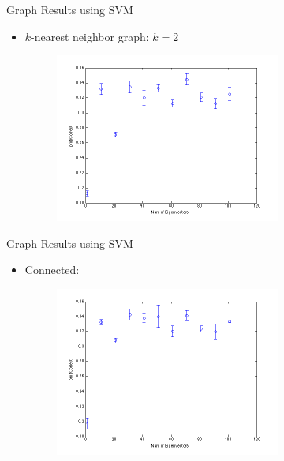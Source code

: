 \documentclass[xcolor=dvipsnames,t]{beamer} %
\begin{document}
\begin{frame}{Graph Results using SVM}
\begin{itemize}
\item $k$-nearest neighbor graph: $k=2$ 
\begin{figure}[h!]
  \centering
    \includegraphics[width=0.7\textwidth]{figures/plotopt2k2n2.png}
\end{figure}
\end{itemize}
\end{frame}
\begin{frame}{Graph Results using SVM}
\begin{itemize}
\item Connected:  
\begin{figure}[h!]
  \centering
    \includegraphics[width=0.7\textwidth]{figures/plotopt3n2.png}
\end{figure}
\end{itemize}
\end{frame}
\end{document}
